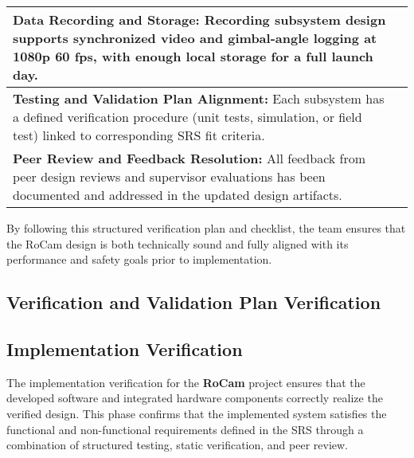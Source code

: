 \documentclass[12pt, titlepage]{article}
\begin{document}
\begin{table}[H]
\begin{tabular}{|p{10cm}|c|}
\textbf{Data Recording and Storage:} Recording subsystem design 
supports synchronized video and gimbal-angle logging at 1080p 60 fps, 
with enough local storage for a full launch day. &  \\ \hline

\textbf{Testing and Validation Plan Alignment:} Each subsystem has 
a defined verification procedure (unit tests, simulation, or field test) 
linked to corresponding SRS fit criteria. &  \\ \hline

\textbf{Peer Review and Feedback Resolution:} All feedback from peer 
design reviews and supervisor evaluations has been documented and 
addressed in the updated design artifacts. &  \\ \hline

\end{tabular}
\end{table}

\noindent
By following this structured verification plan and checklist, the team 
ensures that the RoCam design is both technically sound and fully aligned 
with its performance and safety goals prior to implementation.




\subsection{Verification and Validation Plan Verification}





\subsection{Implementation Verification}

The implementation verification for the \textbf{RoCam} project 
ensures that the developed software and integrated hardware components
 correctly realize the verified design. 
This phase confirms that the implemented system satisfies the functional
 and non-functional requirements defined in the SRS through a combination 
 of structured testing, static verification, and peer review.
\end{document}
